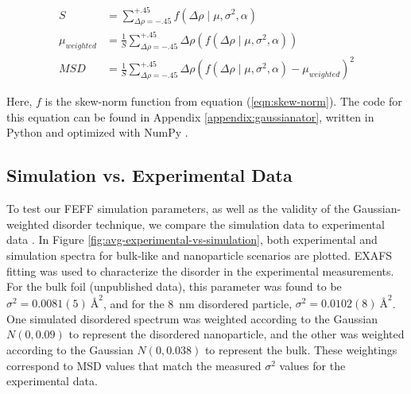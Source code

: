 
\begin{align}
	\label{eqn:updated-weighted-MSD}
	S &= \sum_{\Delta\rho=-.45}^{+.45} f\left(\Delta \rho \mid \mu, \sigma^2, \alpha \right) \\
	\mu_{weighted} &= \frac{1}{S} \sum_{\Delta\rho=-.45}^{+.45} \Delta\rho \left( f ( \Delta \rho \mid \mu, \sigma^2, \alpha ) \right) \\
	MSD &= \frac{1}{S} \sum_{\Delta\rho=-.45}^{+.45} \Delta \rho \left( f ( \Delta \rho \mid \mu, \sigma^2, \alpha ) - \mu_{weighted} \right) ^2
\end{align}

\noindent Here, $ f $ is the skew-norm function from equation (\ref{eqn:skew-norm}). The code for this equation can be found in Appendix \ref{appendix:gaussianator}, written in Python and optimized with NumPy \cite{numpy}.

\subsection{Simulation vs. Experimental Data} \label{sec:end-disorder}

To test our FEFF simulation parameters, as well as the validity of the Gaussian-weighted disorder technique, we compare the simulation data to experimental data \cite{au-nanowires-silca-wang} \cite{crooks-55nm-au-exp} \cite{jing-au-nanoparticle-exp}. In Figure \ref{fig:avg-experimental-vs-simulation}, both experimental and simulation spectra for bulk-like and nanoparticle scenarios are plotted. EXAFS fitting was used to characterize the disorder in the experimental measurements. For the bulk foil (unpublished data), this parameter was found to be $ \sigma^2=0.0081(5)~\text{\AA}^2 $, and for the 8~nm disordered particle, $ \sigma^2=0.0102(8)~\text{\AA}^2 $.  One simulated disordered spectrum was weighted according to the Gaussian $ N(0, 0.09) $ to represent the disordered nanoparticle, and the other was weighted according to the Gaussian $ N(0, 0.038)  $ to represent the bulk. These weightings correspond to MSD values that match the measured $ \sigma^2 $ values for the experimental data.  

